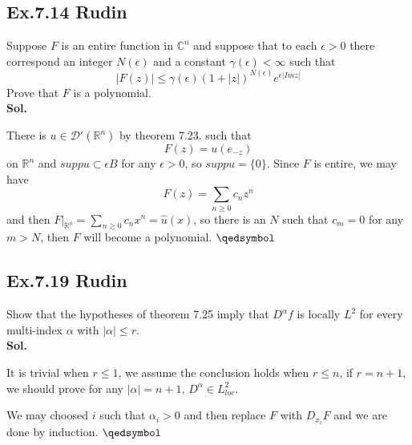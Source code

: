\documentclass[lang=en,11pt,a4paper,citestyle =authoryear]{elegantpaper}
\newcommand{\prvd}{$\hfill \qedsymbol$}
\newcommand{\R}{\mathbb{R}}
\newcommand{\C}{\mathbb{C}}
\newcommand{\D}{\mathscr{D}}
\begin{document}
\subsection*{Ex.7.14 Rudin} 
Suppose $F$ is an entire function in $\C^n$ and suppose that to each $\epsilon > 0$ there correspond an integer $N(\epsilon)$ and a constant $\gamma(\epsilon) < \infty$ such that
\[|F(z)| \leq \gamma(\epsilon)(1+|z|)^{N(\epsilon)}e^{\epsilon|Im z|}\]
Prove that $F$ is a polynomial.
\vspace{0.5em}\\
\textbf{Sol.} \par
There is $u\in\D'(\R^n)$ by theorem 7.23. such that
\[F(z) = u(e_{-z})\]
on $\R^n$ and $supp u \subset \epsilon B$ for any $\epsilon > 0$, so $supp u = \{0\}$. Since $F$ is entire, we may have
\[
F(z) = \sum_{n\geq 0}c_nz^n
\]
and then $F|_{\R^n} = \sum\limits_{n\geq 0}c_n x^n = \hat{u}(x)$, so there is an $N$ such that $c_m = 0$ for any $m>N$, then $F$ will become a polynomial.
\prvd

\subsection*{Ex.7.19 Rudin} 
Show that the hypotheses of theorem 7.25 imply that $D^{\alpha} f$ is locally $L^2$ for every multi-index $\alpha$ with $|\alpha| \leq r$.
\vspace{0.5em}\\
\textbf{Sol.} \par
It is trivial when $r\leq 1$, we assume the conclusion holds when $r \leq n$, if $r= n+1$, we should prove for any $|\alpha| = n+1$, $D^{\alpha} \in L^2_{loc}$.\par
We may choosed $i$ such that $\alpha_i > 0$ and then replace $F$ with $D_{x_i} F$ and we are done by induction.
\prvd
\end{document}
